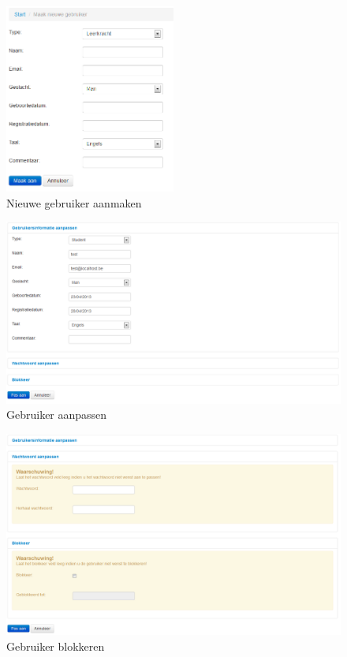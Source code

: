 \documentclass[]{article}
\begin{document}
\begin{figure}[!ht]
	\centering
	\includegraphics[width=0.5\textwidth]{img/create_user}
	\caption{Nieuwe gebruiker aanmaken}
	\label{create_user}
\end{figure}

\begin{figure}[!ht]
	\centering
	\includegraphics[width=1\textwidth]{img/edit_user}
	\caption{Gebruiker aanpassen}
	\label{edit_user}
\end{figure}

\begin{figure}[!ht]
	\centering
	\includegraphics[width=1\textwidth]{img/block_user}
	\caption{Gebruiker blokkeren}
	\label{block_user}
\end{figure}
\end{document}
